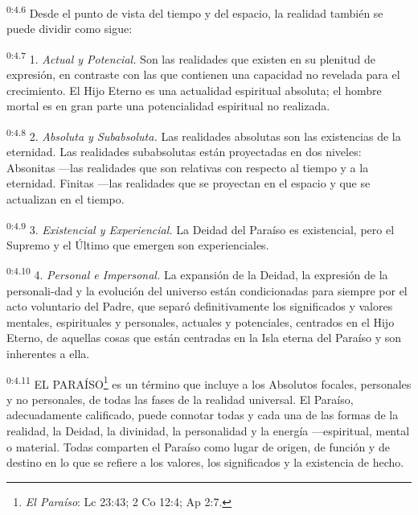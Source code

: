 \par
\textsuperscript{0:4.6} Desde el punto de vista del tiempo y del espacio, la realidad también se puede dividir como sigue:

\par
\textsuperscript{0:4.7} 1. \textit{Actual y Potencial.} Son las realidades que existen en su plenitud de expresión, en contraste con las que contienen una capacidad no revelada para el crecimiento. El Hijo Eterno es una actualidad espiritual absoluta; el hombre mortal es en gran parte una potencialidad espiritual no realizada.

\par
\textsuperscript{0:4.8} 2. \textit{Absoluta y Subabsoluta.} Las realidades absolutas son las existencias de la eternidad. Las realidades subabsolutas están proyectadas en dos niveles: Absonitas ---las realidades que son relativas con respecto al tiempo y a la eternidad. Finitas ---las realidades que se proyectan en el espacio y que se actualizan en el tiempo.

\par
\textsuperscript{0:4.9} 3. \textit{Existencial y Experiencial.} La Deidad del Paraíso es existencial, pero el Supremo y el Último que emergen son experienciales.

\par
\textsuperscript{0:4.10} 4. \textit{Personal e Impersonal.} La expansión de la Deidad, la expresión de la personali-dad y la evolución del universo están condicionadas para siempre por el acto voluntario del Padre, que separó definitivamente los significados y valores mentales, espirituales y personales, actuales y potenciales, centrados en el Hijo Eterno, de aquellas cosas que están centradas en la Isla eterna del Paraíso y son inherentes a ella.

\par
\textsuperscript{0:4.11} EL PARAÍSO\footnote{\textit{El Paraíso}: Lc 23:43; 2 Co 12:4; Ap 2:7.} es un término que incluye a los Absolutos focales, personales y no personales, de todas las fases de la realidad universal. El Paraíso, adecuadamente calificado, puede connotar todas y cada una de las formas de la realidad, la Deidad, la divinidad, la personalidad y la energía ---espiritual, mental o material. Todas comparten el Paraíso como lugar de origen, de función y de destino en lo que se refiere a los valores, los significados y la existencia de hecho.

